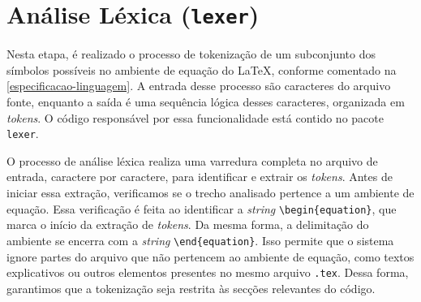 
\section{Análise Léxica (\texttt{lexer})} \label{section-lexer}


Nesta etapa, é realizado o processo de tokenização de um subconjunto dos símbolos possíveis no ambiente de equação do \LaTeX{}, conforme comentado na \autoref{especificacao-linguagem}. A entrada desse processo são caracteres do arquivo fonte, enquanto a saída é uma sequência lógica desses caracteres, organizada em \textit{tokens}. O código responsável por essa funcionalidade  está contido no pacote \texttt{lexer}.

O processo de análise léxica realiza uma varredura completa no arquivo de entrada, caractere por caractere, para identificar e extrair os \textit{tokens}. Antes de iniciar essa extração, verificamos se o trecho analisado pertence a um ambiente de equação. Essa verificação é feita ao identificar a \textit{string} \verb|\begin{equation}|, que marca o início da extração de \textit{tokens}. Da mesma forma, a delimitação do ambiente se encerra com a \textit{string} \verb|\end{equation}|. Isso permite que o sistema ignore partes do arquivo que não pertencem ao ambiente de equação, como textos explicativos ou outros elementos presentes no mesmo arquivo \texttt{.tex}. Dessa forma, garantimos que a tokenização seja restrita às secções relevantes do código.

    
%

